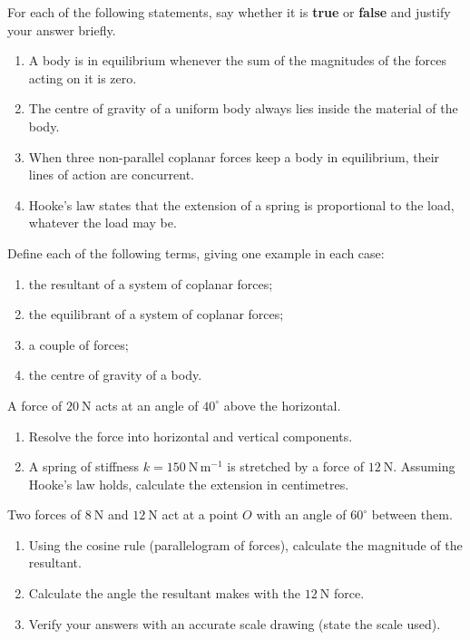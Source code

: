 \documentclass[11pt]{article}
\newcommand{\cle}[1]{{\popxbold\color{popdark}#1}}
\newcounter{popsec}
\newcounter{popsub}
\newcommand{\courssub}[1]{%
  \stepcounter{popsub}%
  \par\vspace{9pt}\noindent{\popxbold\fontsize{11.5}{13}\selectfont\color{popink}{\color{poporange}\thepopsec.\thepopsub}\hspace{6pt}#1}\par\nopagebreak\vspace{4pt}
}
\begin{document}
\begin{exercice}
For each of the following statements, say whether it is \textbf{true} or \textbf{false} and justify your answer briefly.
\begin{enumerate}
\item A body is in equilibrium whenever the sum of the magnitudes of the forces acting on it is zero.
\item The centre of gravity of a uniform body always lies inside the material of the body.
\item When three non-parallel coplanar forces keep a body in equilibrium, their lines of action are concurrent.
\item Hooke's law states that the extension of a spring is proportional to the load, whatever the load may be.
\end{enumerate}
\end{exercice}

\begin{exercice}[Definitions]
Define each of the following terms, giving one example in each case:
\begin{enumerate}
\item the \cle{resultant} of a system of coplanar forces;
\item the \cle{equilibrant} of a system of coplanar forces;
\item a \cle{couple} of forces;
\item the \cle{centre of gravity} of a body.
\end{enumerate}
\end{exercice}

\begin{exercice}
A force of $20\ \mathrm{N}$ acts at an angle of $40^{\circ}$ above the horizontal.
\begin{enumerate}
\item Resolve the force into horizontal and vertical components.
\item A spring of stiffness $k = 150\ \mathrm{N\,m^{-1}}$ is stretched by a force of $12\ \mathrm{N}$. Assuming Hooke's law holds, calculate the extension in centimetres.
\end{enumerate}
\end{exercice}

\courssub{I practise}

\begin{exercice}
Two forces of $8\ \mathrm{N}$ and $12\ \mathrm{N}$ act at a point $O$ with an angle of $60^{\circ}$ between them.
\begin{enumerate}
\item Using the cosine rule (parallelogram of forces), calculate the magnitude of the resultant.
\item Calculate the angle the resultant makes with the $12\ \mathrm{N}$ force.
\item Verify your answers with an accurate scale drawing (state the scale used).
\end{enumerate}
\end{exercice}
\end{document}
